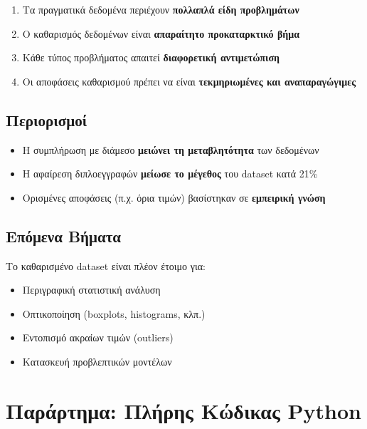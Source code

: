 \documentclass[12pt,a4paper]{article}
\begin{document}
\begin{enumerate}
    \item Τα πραγματικά δεδομένα περιέχουν \textbf{πολλαπλά είδη προβλημάτων}
    \item Ο καθαρισμός δεδομένων είναι \textbf{απαραίτητο προκαταρκτικό βήμα}
    \item Κάθε τύπος προβλήματος απαιτεί \textbf{διαφορετική αντιμετώπιση}
    \item Οι αποφάσεις καθαρισμού πρέπει να είναι \textbf{τεκμηριωμένες και αναπαραγώγιμες}
\end{enumerate}

\subsection{Περιορισμοί}

\begin{itemize}
    \item Η συμπλήρωση με διάμεσο \textbf{μειώνει τη μεταβλητότητα} των δεδομένων
    \item Η αφαίρεση διπλοεγγραφών \textbf{μείωσε το μέγεθος} του dataset κατά 21\%
    \item Ορισμένες αποφάσεις (π.χ. όρια τιμών) βασίστηκαν σε \textbf{εμπειρική γνώση}
\end{itemize}

\subsection{Επόμενα Βήματα}

Το καθαρισμένο dataset είναι πλέον έτοιμο για:
\begin{itemize}
    \item Περιγραφική στατιστική ανάλυση
    \item Οπτικοποίηση (boxplots, histograms, κλπ.)
    \item Εντοπισμό ακραίων τιμών (outliers)
    \item Κατασκευή προβλεπτικών μοντέλων
\end{itemize}

\appendix
\section{Παράρτημα: Πλήρης Κώδικας Python}
\end{document}
